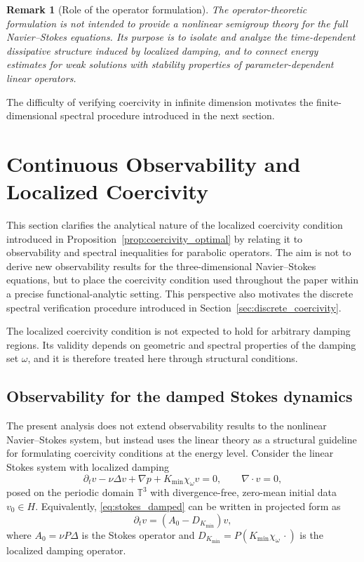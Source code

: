 \documentclass[preprint,12pt]{elsarticle}
\newtheorem{remark}[theorem]{Remark}
\begin{document}
\begin{remark}[Role of the operator formulation]
The operator-theoretic formulation is not intended to provide a nonlinear
semigroup theory for the full Navier--Stokes equations.
Its purpose is to isolate and analyze the time-dependent dissipative structure
induced by localized damping, and to connect energy estimates for weak solutions
with stability properties of parameter-dependent linear operators.
\end{remark}

The difficulty of verifying coercivity in infinite dimension motivates the
finite-dimensional spectral procedure introduced in the next section.

\section{Continuous Observability and Localized Coercivity}
\label{sec:continuous_observability}

This section clarifies the analytical nature of the localized coercivity
condition introduced in Proposition~\ref{prop:coercivity_optimal} by relating it
to observability and spectral inequalities for parabolic operators.
The aim is not to derive new observability results for the
three-dimensional Navier--Stokes equations, but to place the coercivity condition
used throughout the paper within a precise functional-analytic setting.
This perspective also motivates the discrete spectral verification procedure
introduced in Section~\ref{sec:discrete_coercivity}.

The localized coercivity condition is not expected to hold for arbitrary damping
regions.
Its validity depends on geometric and spectral properties of the damping set
$\omega$, and it is therefore treated here through structural conditions.

\subsection{Observability for the damped Stokes dynamics}
The present analysis does not extend observability results to the nonlinear
Navier--Stokes system, but instead uses the linear theory as a structural
guideline for formulating coercivity conditions at the energy level.
Consider the linear Stokes system with localized damping
\begin{equation}
\label{eq:stokes_damped}
\partial_t v - \nu \Delta v + \nabla p + K_{\min}\chi_\omega v = 0,
\qquad \nabla\cdot v = 0,
\end{equation}
posed on the periodic domain $\mathbb{T}^3$ with divergence-free, zero-mean
initial data $v_0\in H$.
Equivalently, \eqref{eq:stokes_damped} can be written in projected form as
\[
\partial_t v = (A_0-D_{K_{\min}})v,
\]
where $A_0=\nu P\Delta$ is the Stokes operator and
$D_{K_{\min}}=P(K_{\min}\chi_\omega\,\cdot)$ is the localized damping operator.
\end{document}
